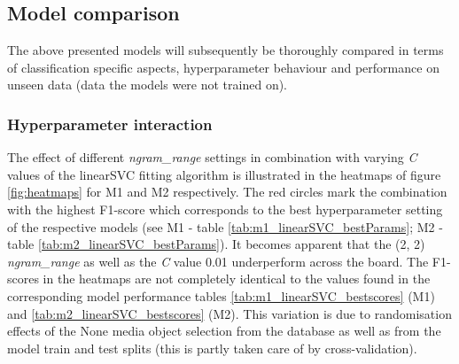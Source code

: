 \subsection{Model comparison}
The above presented models will subsequently be thoroughly compared in terms of classification specific aspects, hyperparameter behaviour and performance on unseen data (data the models were not trained on). 

\subsubsection*{Hyperparameter interaction}
The effect of different \textit{ngram\_range} settings in combination with varying \textit{C} values of the linearSVC fitting algorithm is illustrated in the heatmaps of figure \ref{fig:heatmaps} for M1 and M2 respectively. The red circles mark the combination with the highest F1-score which corresponds to the best hyperparameter setting of the respective models (see M1 - table \ref{tab:m1_linearSVC_bestParams}; M2 - table \ref{tab:m2_linearSVC_bestParams}). It becomes apparent that the (2, 2) \textit{ngram\_range} as well as the \textit{C} value 0.01 underperform across the board. The F1-scores in the heatmaps are not completely identical to the values found in the corresponding model performance tables \ref{tab:m1_linearSVC_bestscores} (M1) and \ref{tab:m2_linearSVC_bestscores} (M2). This variation is due to randomisation effects of the None media object selection from the database as well as from the model train and test splits (this is partly taken care of by cross-validation).\\

